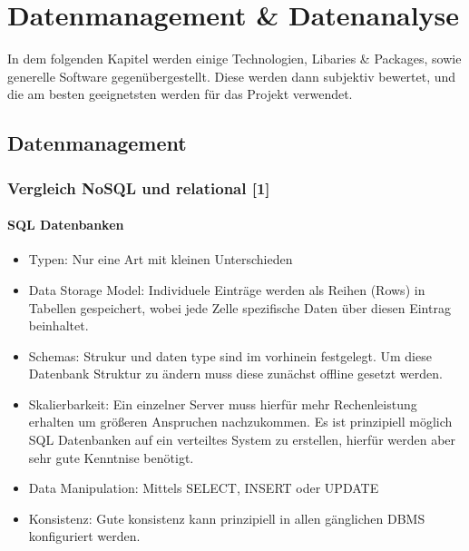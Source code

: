 \chapter{Datenmanagement \& Datenanalyse}

In dem folgenden Kapitel werden einige Technologien, Libaries & Packages, sowie generelle Software gegenübergestellt. Diese werden dann subjektiv bewertet, und die am besten geeignetsten werden für das Projekt verwendet.

\section{Datenmanagement}

	\subsection{Vergleich NoSQL und relational [1]}
		\subsubsection{SQL Datenbanken}
			\begin{itemize}
				\item Typen: Nur eine Art mit kleinen Unterschieden
				\item Data Storage Model: Individuele Einträge werden als Reihen (Rows) in Tabellen gespeichert, wobei jede Zelle spezifische Daten über diesen Eintrag beinhaltet. 
				\item Schemas: Strukur und daten type sind im vorhinein festgelegt. Um diese Datenbank Struktur zu ändern muss diese zunächst offline gesetzt werden.
				\item Skalierbarkeit: Ein einzelner Server muss hierfür mehr Rechenleistung erhalten um größeren Anspruchen nachzukommen. Es ist prinzipiell möglich SQL Datenbanken auf ein verteiltes System zu erstellen, hierfür werden aber sehr gute Kenntnise benötigt.
				\item Data Manipulation: Mittels SELECT, INSERT oder UPDATE
				\item Konsistenz: Gute konsistenz kann prinzipiell in allen gänglichen DBMS konfiguriert werden.
			\end{itemize}

